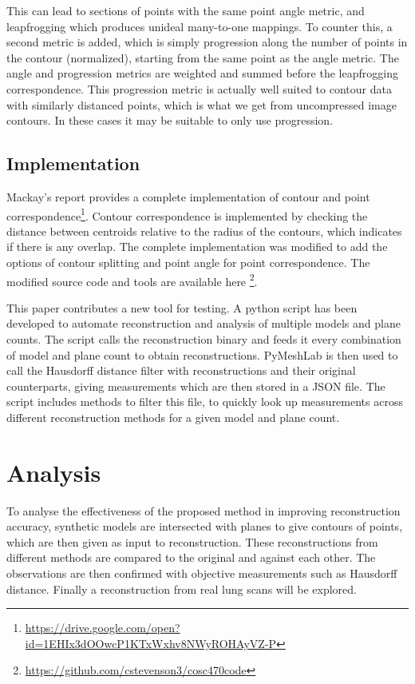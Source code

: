 \documentclass[11p, titlepage]{article}
\begin{document}
This can lead to sections of points with the same point angle metric, and leapfrogging which produces unideal many-to-one mappings. To counter this, a second metric is added, which is simply progression along the number of points in the contour (normalized), starting from the same point as the angle metric. The angle and progression metrics are weighted and summed before the leapfrogging correspondence. This progression metric is actually well suited to contour data with similarly distanced points, which is what we get from uncompressed image contours. In these cases it may be suitable to only use progression.

\subsection{Implementation}

Mackay's report provides a complete implementation of contour and point correspondence\footnote{\url{https://drive.google.com/open?id=1EHIx3dOOwcP1KTxWxhv8NWyROHAyVZ-P}}. Contour correspondence is implemented by checking the distance between centroids relative to the radius of the contours, which indicates if there is any overlap. The complete implementation was modified to add the options of contour splitting and point angle for point correspondence. The modified source code and tools are available here \footnote{\url{https://github.com/cstevenson3/cosc470code}}.

This paper contributes a new tool for testing. A python script has been developed to automate reconstruction and analysis of multiple models and plane counts. The script calls the reconstruction binary and feeds it every combination of model and plane count to obtain reconstructions. PyMeshLab \cite{pymeshlab} is then used to call the Hausdorff distance filter with reconstructions and their original counterparts, giving measurements which are then stored in a JSON file. The script includes methods to filter this file, to quickly look up measurements across different reconstruction methods for a given model and plane count.
\pagebreak

\section{Analysis}

To analyse the effectiveness of the proposed method in improving reconstruction accuracy, synthetic models are intersected with planes to give contours of points, which are then given as input to reconstruction. These reconstructions from different methods are compared to the original and against each other. The observations are then confirmed with objective measurements such as Hausdorff distance. Finally a reconstruction from real lung scans will be explored.
\end{document}
